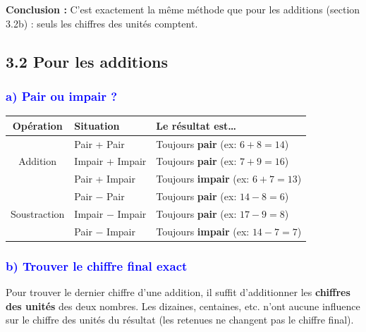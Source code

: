 \documentclass{exam}
\begin{document}
\textbf{Conclusion :} C'est exactement la même méthode que pour les additions (section 3.2b) : seuls les chiffres des unités comptent.

\subsection*{\textcolor{blue!60!black}{3.2 Pour les additions}}

\subsubsection*{\textcolor{blue}{a) Pair ou impair ?}}

\begin{center}
\renewcommand{\arraystretch}{1.5}
\begin{tabular}{|c|l|l|}
\hline
\rowcolor{gray!20}
\textbf{Opération} & \textbf{Situation} & \textbf{Le résultat est\ldots} \\
\hline
\multirow{3}{*}{Addition} & Pair + Pair & Toujours \textbf{pair} \quad (ex: $6 + 8 = 14$) \\ \cline{2-3}
 & Impair + Impair & Toujours \textbf{pair} \quad (ex: $7 + 9 = 16$) \\ \cline{2-3}
 & Pair + Impair & Toujours \textbf{impair} \quad (ex: $6 + 7 = 13$) \\ \hline
\multirow{3}{*}{Soustraction} & Pair $-$ Pair & Toujours \textbf{pair} \quad (ex: $14 - 8 = 6$) \\ \cline{2-3}
 & Impair $-$ Impair & Toujours \textbf{pair} \quad (ex: $17 - 9 = 8$) \\ \cline{2-3}
 & Pair $-$ Impair & Toujours \textbf{impair} \quad (ex: $14 - 7 = 7$) \\ \hline
\end{tabular}
\end{center}

\subsubsection*{\textcolor{blue}{b) Trouver le chiffre final exact}}

Pour trouver le dernier chiffre d'une addition, il suffit d'additionner les \textbf{chiffres des unités} des deux nombres. Les dizaines, centaines, etc. n'ont aucune influence sur le chiffre des unités du résultat (les retenues ne changent pas le chiffre final).
\end{document}
